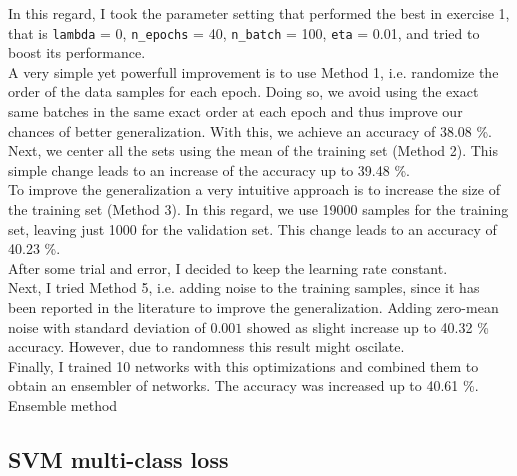 \documentclass[journal, a4paper]{IEEEtran}
\begin{document}
In this regard, I took the parameter setting that performed the best in exercise 1, that is \texttt{lambda} = 0, \texttt{n\_epochs} = 40, \texttt{n\_batch} = 100, \texttt{eta} = 0.01, and tried to boost its performance.\\


A very simple yet powerfull improvement is to use Method 1, i.e. randomize the order of the data samples for each epoch. Doing so, we avoid using the exact same batches in the same exact order at each epoch and thus improve our chances of better generalization. With this, we achieve an accuracy of 38.08 \%. \\

Next, we center all the sets using the mean of the training set (Method 2). This simple change leads to an increase of the accuracy up to 39.48 \%.\\

To improve the generalization a very intuitive approach is to increase the size of the training set (Method 3). In this regard, we use 19000 samples for the training set, leaving just 1000 for the validation set. This change leads to an accuracy of 40.23 \%.  \\

After some trial and error, I decided to keep the learning rate constant. \\%

Next, I tried Method 5, i.e. adding noise to the training samples, since it has been reported in the literature \cite{an1996effects} to improve the generalization. Adding zero-mean noise with standard deviation of $0.001$ showed as slight increase up to 40.32 \% accuracy. However, due to randomness this result might oscilate.\\


Finally, I trained 10 networks with this optimizations and combined them to obtain an ensembler of networks. The accuracy was increased up to 40.61 \%. \\


Ensemble method

\subsection{SVM multi-class loss}

\end{document}
